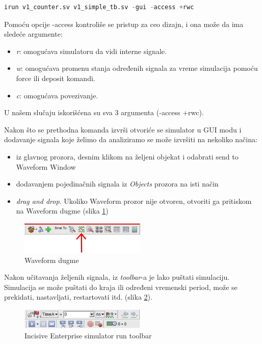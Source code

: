 \begin{lstlisting}[language=Python]
irun v1_counter.sv v1_simple_tb.sv -gui -access +rwc
\end{lstlisting}

Pomoću opcije -access kontroliše se pristup za ceo dizajn, i ona može da ima sledeće argumente:
\begin{itemize}
\item \emph{r}: omogućava simulatoru da vidi interne signale.
\item \emph{w}: omogućava promenu stanja određenih signala za vreme simulacija pomoću force ili deposit komandi.
\item \emph{c}: omogućava povezivanje.
\end{itemize}
U našem slučaju iskorišćena su sva 3 argumenta (-access +rwc).

Nakon što se prethodna komanda izvrši otvoriće se simulator u GUI modu i 
dodavanje signala koje želimo da analiziramo se može izvršiti na nekoliko načina:
\begin{itemize}
\item iz glavnog prozora, desnim klikom na željeni objekat i odabrati send
to Waveform Window
\item dodavanjem pojedinačnih signala iz \emph{Objects} prozora na isti način
\item \emph{drag and drop}. Ukoliko Waveform prozor nije otvoren, otvoriti ga pritiskom na Waveform dugme (slika \ref{fig:Waveform_dugme})
\end{itemize}

\begin{figure}[h!]
  \center
  \includegraphics[width=60mm, scale=0.5]{img/v1_waveform_dugme.png}
  \caption{Waveform dugme}
  \label{fig:Waveform_dugme}
\end{figure}


Nakon učitavanja željenih signala, iz \emph{toolbar}-a je lako puštati
simulaciju.
Simulacija se može puštati do kraja ili određeni vremenski period, može se
prekidati, nastavljati, restartovati itd. (slika \ref{fig:Incisive_Enterprise_simulator_run_toolbar}).\\

\begin{figure}[h!]
  \center
  \includegraphics[width=60mm, scale=0.5]{img/v1_Incisive_Enterprise_Simulator_toolbar.png}
  \caption{Incisive Enterprise simulator run toolbar}
  \label{fig:Incisive_Enterprise_simulator_run_toolbar}
\end{figure}


